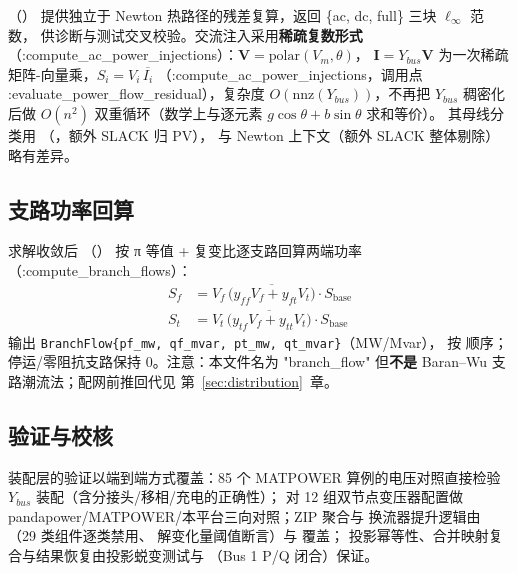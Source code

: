 （）
提供独立于 Newton 热路径的残差复算，返回 \{ac, dc, full\} 三块 $\ell_\infty$ 范数，
供诊断与测试交叉校验。交流注入采用\textbf{稀疏复数形式}
（:compute\_ac\_power\_injections）：$\mathbf V=\mathrm{polar}(V_m,\theta)$，
$\mathbf I=Y_{bus}\mathbf V$ 为一次稀疏矩阵-向量乘，$S_i=V_i\,\overline{I_i}$
（:compute\_ac\_power\_injections，调用点 :evaluate\_power\_flow\_residual），复杂度 $O(\mathrm{nnz}(Y_{bus}))$，不再把 $Y_{bus}$
稠密化后做 $O(n^2)$ 双重循环（数学上与逐元素 $g\cos\theta+b\sin\theta$ 求和等价）。
其母线分类用
（，额外 SLACK 归 PV），
与 Newton 上下文（额外 SLACK 整体剔除）略有差异。

\subsection{支路功率回算}
求解收敛后 （）
按 π 等值 + 复变比逐支路回算两端功率（:compute\_branch\_flows）：
\begin{align*}
S_f &= V_f\,\overline{\big(y_{ff}V_f+y_{ft}V_t\big)}\cdot S_{\mathrm{base}}\\
S_t &= V_t\,\overline{\big(y_{tf}V_f+y_{tt}V_t\big)}\cdot S_{\mathrm{base}}
\end{align*}
输出 \texttt{BranchFlow\{pf\_mw, qf\_mvar, pt\_mw, qt\_mvar\}}（MW/Mvar），
按  顺序；停运/零阻抗支路保持 0。注意：本文件名为
"branch\_flow" 但\textbf{不是} Baran--Wu 支路潮流法；配网前推回代见
第~\ref{sec:distribution}~章。

\subsection{验证与校核}
装配层的验证以端到端方式覆盖：85 个 MATPOWER 算例的电压对照直接检验 $Y_{bus}$
装配（含分接头/移相/充电的正确性）；
对 12 组双节点变压器配置做 pandapower/MATPOWER/本平台三向对照；ZIP 聚合与
换流器提升逻辑由 （29 类组件逐类禁用、
解变化量阈值断言）与  覆盖；
投影幂等性、合并映射复合与结果恢复由投影蜕变测试与
（Bus 1 P/Q 闭合）保证。
